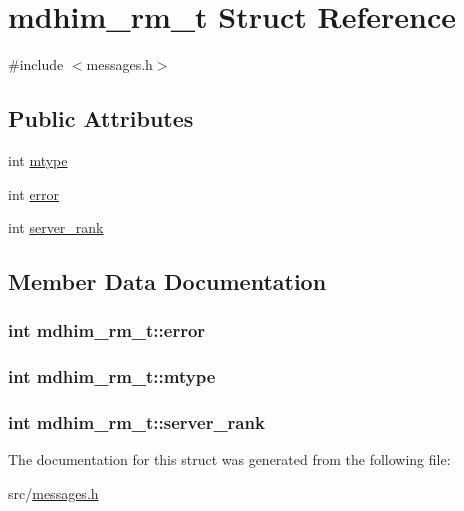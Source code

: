\hypertarget{structmdhim__rm__t}{\section{mdhim\-\_\-rm\-\_\-t Struct Reference}
\label{d2/d0c/structmdhim__rm__t}
}


{\ttfamily \#include $<$messages.\-h$>$}

\subsection*{Public Attributes}
\begin{DoxyCompactItemize}
\item 
int \hyperlink{structmdhim__rm__t_ad4fc1bc6965fe36cf6bef6c2813dba8d}{mtype}
\item 
int \hyperlink{structmdhim__rm__t_af7305ef9c55d3d60b91610408a88893f}{error}
\item 
int \hyperlink{structmdhim__rm__t_a8c6b340ab11d8fb8c7d8540cb59d9246}{server\-\_\-rank}
\end{DoxyCompactItemize}


\subsection{Member Data Documentation}
\hypertarget{structmdhim__rm__t_af7305ef9c55d3d60b91610408a88893f}{
\subsubsection[{error}]{\setlength{\rightskip}{0pt plus 5cm}int mdhim\-\_\-rm\-\_\-t\-::error}}\label{d2/d0c/structmdhim__rm__t_af7305ef9c55d3d60b91610408a88893f}
\hypertarget{structmdhim__rm__t_ad4fc1bc6965fe36cf6bef6c2813dba8d}{
\subsubsection[{mtype}]{\setlength{\rightskip}{0pt plus 5cm}int mdhim\-\_\-rm\-\_\-t\-::mtype}}\label{d2/d0c/structmdhim__rm__t_ad4fc1bc6965fe36cf6bef6c2813dba8d}
\hypertarget{structmdhim__rm__t_a8c6b340ab11d8fb8c7d8540cb59d9246}{
\subsubsection[{server\-\_\-rank}]{\setlength{\rightskip}{0pt plus 5cm}int mdhim\-\_\-rm\-\_\-t\-::server\-\_\-rank}}\label{d2/d0c/structmdhim__rm__t_a8c6b340ab11d8fb8c7d8540cb59d9246}


The documentation for this struct was generated from the following file\-:\begin{DoxyCompactItemize}
\item 
src/\hyperlink{messages_8h}{messages.\-h}\end{DoxyCompactItemize}
